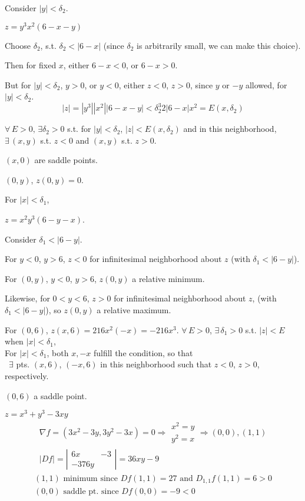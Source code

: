 \documentclass[twoside]{amsart}
\theoremstyle{plain}
\theoremstyle{definition}
\newcommand{\exercisehead}[1]
  {
   \noindent{\small\bf Exercise #1.}
   \smallskip}
\begin{document}
Consider $|y| < \delta_2$.  

$z = y^3 x^2(6-x-y)$

Choose $\delta_2$, s.t. $\delta_2 < |6-x|$ (since $\delta_2$ is arbitrarily small, we can make this choice).  

Then for fixed $x$, either $6-x < 0$, or $6-x >0$.  

But for $|y| < \delta_2$, $y >0$, or $y<0$, either $z<0$, $z>0$, since $y$ or $-y$ allowed, for $|y| < \delta_2$.  
\[
|z| = |y^3| |x^2| |6-x-y| < \delta_2^3 2 |6-x| x^2 = E(x,\delta_2)
\]

$\forall \, E > 0, \, \exists \delta_2 >0$ s.t. for $|y| < \delta_2$, $|z| < E(x,\delta_2)$ and in this neighborhood, $\exists \, (x,y)$ s.t. $z<0$ and $(x,y)$ s.t. $z>0$.  

$(x,0)$ are saddle points.  

$(0,y)$, $z(0,y) =0$.  

For $|x| < \delta_1$, 

$z = x^2  y^3 (6-y-x)$.  

Consider $\delta_1 < |6-y|$.  

For $y< 0$, $y>6$, $z<0$ for infinitesimal neighborhood about $z$ (with $\delta_1 < |6-y|$).  

For $(0,y)$, $y<0$, $y>6$, $z(0,y)$ a relative minimum.  

Likewise, for $0<y<6$, $z>0$ for infinitesimal neighborhood about $z$, (with $\delta_1 < |6-y|$), so $z(0,y)$ a relative maximum.  

For $(0,6)$, $z(x,6) = 216 x^2 ( -x) = -216 x^3$.  $\forall \, E > 0$, $\exists \, \delta_1 >0$ s.t. $|z| < E$ when $|x| < \delta_1$, \\

For $|x| < \delta_1$, both $x,-x$ fulfill the condition, so that \\
\quad \, $\exists$ pts. $(x,6)$, $(-x,6)$ in this neighborhood such that $z<0$, $z>0$, respectively.

$(0,6)$ a saddle point.  

\exercisehead{9} $z = x^3 + y^3 - 3xy$
\[
\begin{gathered}
  \nabla f = (3x^2 - 3y, 3y^2 - 3x) = 0 \Longrightarrow \begin{aligned} x^2 = y \\ y^2 = x \end{aligned} \Longrightarrow (0,0), (1,1) \\ 
|Df| = \left| \begin{matrix} 6x & -3 \\ -3 7 6y \end{matrix} \right| = 36xy - 9 
\end{gathered}
\]
\[
\begin{gathered}
  (1,1) \text{ minimum since } Df(1,1) = 27 \text{ and } D_{1,1}f(1,1) = 6 > 0 \\
  (0,0) \text{ saddle pt. since } Df(0,0) = -9 < 0 
\end{gathered}
\]
\end{document}

